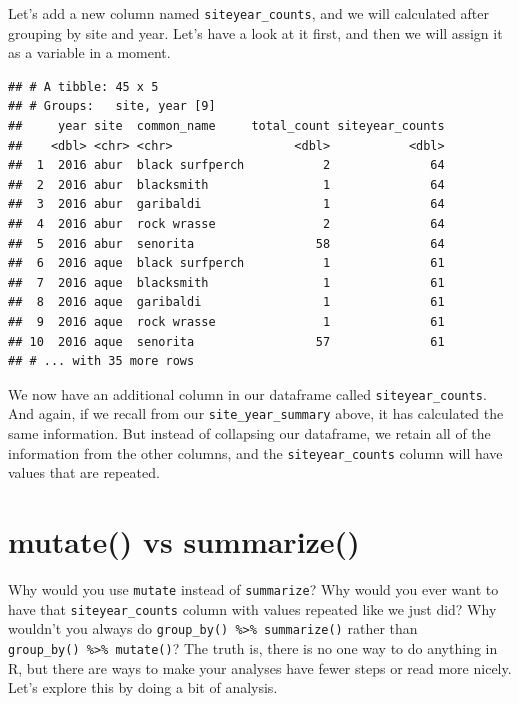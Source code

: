 \documentclass[]{book}
\newenvironment{Shaded}{\begin{snugshade}}{\end{snugshade}}
\newcommand{\DataTypeTok}[1]{\textcolor[rgb]{0.13,0.29,0.53}{#1}}
\newcommand{\KeywordTok}[1]{\textcolor[rgb]{0.13,0.29,0.53}{\textbf{#1}}}
\newcommand{\NormalTok}[1]{#1}
\newcommand{\OperatorTok}[1]{\textcolor[rgb]{0.81,0.36,0.00}{\textbf{#1}}}
\newcommand{\StringTok}[1]{\textcolor[rgb]{0.31,0.60,0.02}{#1}}
\begin{document}
Let's add a new column named \texttt{siteyear\_counts}, and we will calculated after grouping by site and year. Let's have a look at it first, and then we will assign it as a variable in a moment.

\begin{Shaded}
\end{Shaded}

\begin{verbatim}
## # A tibble: 45 x 5
## # Groups:   site, year [9]
##     year site  common_name     total_count siteyear_counts
##    <dbl> <chr> <chr>                 <dbl>           <dbl>
##  1  2016 abur  black surfperch           2              64
##  2  2016 abur  blacksmith                1              64
##  3  2016 abur  garibaldi                 1              64
##  4  2016 abur  rock wrasse               2              64
##  5  2016 abur  senorita                 58              64
##  6  2016 aque  black surfperch           1              61
##  7  2016 aque  blacksmith                1              61
##  8  2016 aque  garibaldi                 1              61
##  9  2016 aque  rock wrasse               1              61
## 10  2016 aque  senorita                 57              61
## # ... with 35 more rows
\end{verbatim}

We now have an additional column in our dataframe called \texttt{siteyear\_counts}. And again, if we recall from our \texttt{site\_year\_summary} above, it has calculated the same information. But instead of collapsing our dataframe, we retain all of the information from the other columns, and the \texttt{siteyear\_counts} column will have values that are repeated.

\hypertarget{mutate-vs-summarize}{%
\section{mutate() vs summarize()}\label{mutate-vs-summarize}}

Why would you use \texttt{mutate} instead of \texttt{summarize}? Why would you ever want to have that \texttt{siteyear\_counts} column with values repeated like we just did? Why wouldn't you always do \texttt{group\_by()\ \%\textgreater{}\%\ summarize()} rather than \texttt{group\_by()\ \%\textgreater{}\%\ mutate()}? The truth is, there is no one way to do anything in R, but there are ways to make your analyses have fewer steps or read more nicely. Let's explore this by doing a bit of analysis.
\end{document}
